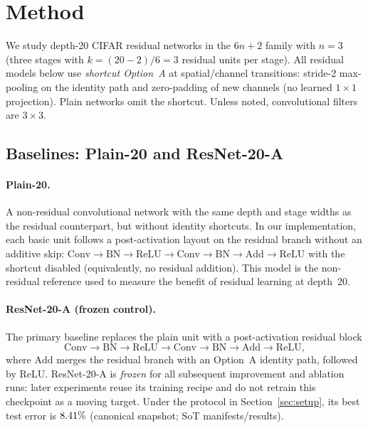 \section{Method}
\label{sec:method}


We study depth-20 CIFAR residual networks in the $6n{+}2$ family with $n{=}3$
(three stages with $k{=}(20{-}2)/6{=}3$ residual units per stage).
All residual models below use \emph{shortcut Option~A} at spatial/channel transitions:
stride-2 max-pooling on the identity path and zero-padding of new channels
(no learned $1{\times}1$ projection).
Plain networks omit the shortcut.
Unless noted, convolutional filters are $3{\times}3$.

\subsection{Baselines: Plain-20 and ResNet-20-A}
\label{sec:method-baselines}

\paragraph{Plain-20.}
A non-residual convolutional network with the same depth and stage widths as the residual counterpart,
but without identity shortcuts.
In our implementation, each basic unit follows a post-activation layout on the residual branch
without an additive skip:
$\mathrm{Conv}{\rightarrow}\mathrm{BN}{\rightarrow}\mathrm{ReLU}{\rightarrow}\mathrm{Conv}{\rightarrow}\mathrm{BN}{\rightarrow}\mathrm{Add}{\rightarrow}\mathrm{ReLU}$
with the shortcut disabled (equivalently, no residual addition).
This model is the non-residual reference used to measure the benefit of residual learning
at depth~20.

\paragraph{ResNet-20-A (frozen control).}
The primary baseline replaces the plain unit with a post-activation residual block
\[
\mathrm{Conv}{\rightarrow}\mathrm{BN}{\rightarrow}\mathrm{ReLU}{\rightarrow}\mathrm{Conv}{\rightarrow}\mathrm{BN}{\rightarrow}\mathrm{Add}{\rightarrow}\mathrm{ReLU},
\]
where $\mathrm{Add}$ merges the residual branch with an Option~A identity path, followed by ReLU.
ResNet-20-A is \emph{frozen} for all subsequent improvement and ablation runs:
later experiments reuse its training recipe and do not retrain this checkpoint as a moving target.
Under the protocol in Section~\ref{sec:setup}, its best test error is $8.41\%$
(canonical snapshot; SoT manifests/results).

